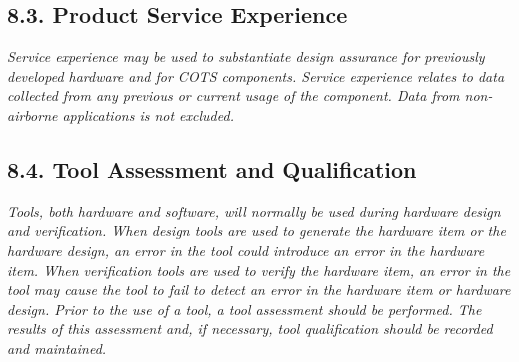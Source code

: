 \documentclass[]{article}
\begin{document}
\subsection{8.3. Product Service
Experience}\label{product-service-experience}

\emph{Service experience may be used to substantiate design assurance
for previously developed hardware and for COTS components. Service
experience relates to data collected from any previous or current usage
of the component. Data from non-airborne applications is not excluded.}

\subsection{8.4. Tool Assessment and
Qualification}\label{tool-assessment-and-qualification}

\emph{Tools, both hardware and software, will normally be used during
hardware design and verification. When design tools are used to generate
the hardware item or the hardware design, an error in the tool could
introduce an error in the hardware item. When verification tools are
used to verify the hardware item, an error in the tool may cause the
tool to fail to detect an error in the hardware item or hardware design.
Prior to the use of a tool, a tool assessment should be performed. The
results of this assessment and, if necessary, tool qualification should
be recorded and maintained.}
\end{document}
